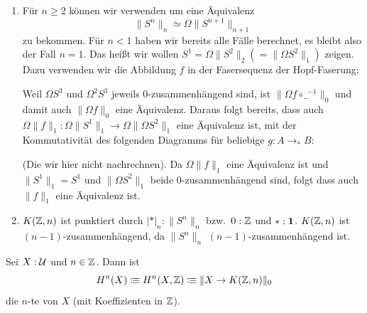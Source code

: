 \begin{beweis}
  \begin{enumerate}
  \item Für \(n\geq 2\) können wir  verwenden um eine Äquivalenz
    \[
      \|S^n\|_n\simeq \Omega\|S^{n+1}\|_{n+1}
    \]
    zu bekommen. Für \(n<1\) haben wir bereits alle Fälle berechnet, es bleibt also der Fall \(n=1\).
    Das heißt wir wollen \(S^1=\Omega\|S^2\|_2(=\|\Omega S^2\|_1) \) zeigen.
    Dazu verwenden wir die Abbildung \(f\) in der Fasersequenz der Hopf-Faserung:
    \begin{center}
    \end{center}
    Weil \(\Omega S^3\) und \(\Omega^2 S^3\) jeweils \(0\)-zusammenhängend sind, ist
    \(\|\Omega f\circ \_^{-1}\|_0 \) und damit auch \(\|\Omega f\|_0\) eine Äquivalenz.
    Daraus folgt bereits, dass auch \(\Omega \|f\|_1:\Omega\|S^1\|_1\to \Omega\|\Omega S^2\|_1\) eine Äquivalenz ist,
    mit der Kommutativität des folgenden Diagramms für beliebige \(g:A\to_\ast B\):
    \begin{center}
    \end{center}
    (Die wir hier nicht nachrechnen). Da \(\Omega \|f\|_1\) eine Äquivalenz ist und \(\|S^1\|_1=S^1\) und \(\|\Omega S^2\|_1\) beide \(0\)-zusammenhängend sind, folgt dass auch \(\|f\|_1\) eine Äquivalenz ist.
  \item \(K(\mathbb{Z},n)\) ist punktiert durch \(|\ast|_n:\|S^n\|_n\) bzw.\ \(0:\mathbb{Z}\) und \(\ast:\mathbf{1}\).
    \(K(\mathbb{Z},n)\) ist \((n-1)\)-zusammenhängend, da \(\|S^n\|_n\) \((n-1)\)-zusammenhängend ist.
  \end{enumerate}
\end{beweis}

\begin{definition}
  Sei \(X:\mathcal{U}\) und \(n\in\mathbb{Z}\). Dann ist
  \[
    H^n(X)\vcentcolon\mspace{-1.2mu}\equiv H^n(X,\mathbb{Z})\vcentcolon\mspace{-1.2mu}\equiv \|X\to K(\mathbb{Z},n)\|_0
  \]
  die \(n\)-te  von \(X\) (mit Koeffizienten in \(\mathbb{Z}\)).
\end{definition}

